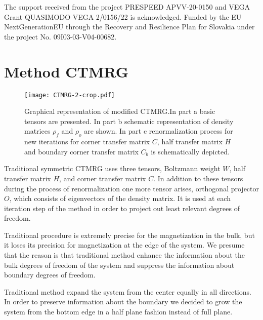 \documentclass[showpacs,amssymb,twocolumn,floatfix,aps,pre,notitlepage]{revtex4-2}
\begin{document}
\begin{acknowledgments}
The support received from the project PRESPEED APVV-20-0150 and VEGA Grant QUASIMODO
 VEGA 2/0156/22 is acknowledged. 
 Funded by the EU NextGenerationEU through the Recovery and Resilience Plan for Slovakia under the project No. 09I03-03-V04-00682.
\end{acknowledgments}


\appendix

\section{Method CTMRG}\label{CTMRG}

\begin{figure}[t!]
\begin{center}
\texttt{[image: CTMRG-2-crop.pdf]}
\caption{Graphical representation of modified CTMRG.In part a basic tensors are presented. In part b schematic representation of density matrices $\rho_f$ and $\rho_o$ are shown. In part c renormalization process for new iterations for corner transfer matrix $C$, half transfer matrix $H$ and boundary corner transfer matrix $C_b$ is schematically depicted.  }
\label{fig:CTMRG}
\end{center}
\end{figure}


Traditional symmetric CTMRG uses three tensors, Boltzmann weight $W$, half transfer matrix $H$, and corner transfer matrix $C$. In addition to these tensors during the process of renormalization one more tensor arises, orthogonal projector $O$, which consists of eigenvectors of the density matrix. It is used at each iteration step of the method in order to project out least relevant degrees of freedom. 

Traditional procedure is extremely precise for the magnetization in the bulk, but it loses its precision for magnetization at the edge of the system. We presume that the reason is that traditional method enhance the information about the bulk degrees of freedom of the system and suppress the information about boundary degrees of freedom. 

Traditional method expand the system from the center equally in all directions. In order to preserve information about the boundary we decided to grow the system from the bottom edge in a half plane fashion instead of full plane.
\end{document}
